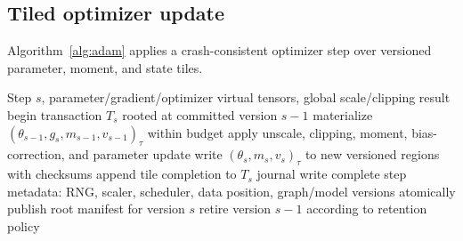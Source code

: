 \subsection{Tiled optimizer update}

Algorithm~\ref{alg:adam} applies a crash-consistent optimizer step over versioned parameter, moment, and state tiles.

\begin{algorithm}[H]
\caption{Transactional streamed Adam-like update}
\label{alg:adam}
\begin{algorithmic}[1]
\Require Step $s$, parameter/gradient/optimizer virtual tensors, global scale/clipping result
\State begin transaction $T_s$ rooted at committed version $s-1$
  \State materialize $(\theta_{s-1},g_s,m_{s-1},v_{s-1})_\tau$ within budget
  \State apply unscale, clipping, moment, bias-correction, and parameter update
  \State write $(\theta_s,m_s,v_s)_\tau$ to new versioned regions with checksums
  \State append tile completion to $T_s$ journal
\EndFor
\State write complete step metadata: RNG, scaler, scheduler, data position, graph/model versions
\State atomically publish root manifest for version $s$
\State retire version $s-1$ according to retention policy
\end{algorithmic}
\end{algorithm}
